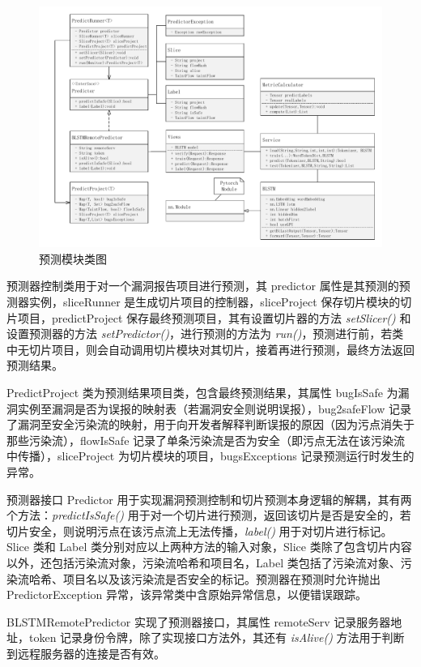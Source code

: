 \begin{figure}[!htbp]
    \centering
    \includegraphics[width=0.9\linewidth]{FIGs/chapter3/predictClass.pdf}
    \caption{预测模块类图}\label{predictClass}
\end{figure}

预测器控制类用于对一个漏洞报告项目进行预测，其 predictor 属性是其预测的预测器实例，sliceRunner 是生成切片项目的控制器，sliceProject 保存切片模块的切片项目，predictProject 保存最终预测项目，其有设置切片器的方法 \textit{setSlicer()} 和设置预测器的方法 \textit{setPredictor()}，进行预测的方法为 \textit{run()}，预测进行前，若类中无切片项目，则会自动调用切片模块对其切片，接着再进行预测，最终方法返回预测结果。

PredictProject 类为预测结果项目类，包含最终预测结果，其属性 bugIsSafe 为漏洞实例至漏洞是否为误报的映射表（若漏洞安全则说明误报），bug2safeFlow 记录了漏洞至安全污染流的映射，用于向开发者解释判断误报的原因（因为污点消失于那些污染流），flowIsSafe 记录了单条污染流是否为安全（即污点无法在该污染流中传播），sliceProject 为切片模块的项目，bugsExceptions 记录预测运行时发生的异常。

预测器接口 Predictor 用于实现漏洞预测控制和切片预测本身逻辑的解耦，其有两个方法：\textit{predictIsSafe()} 用于对一个切片进行预测，返回该切片是否是安全的，若切片安全，则说明污点在该污点流上无法传播，\textit{label()} 用于对切片进行标记。Slice 类和 Label 类分别对应以上两种方法的输入对象，Slice 类除了包含切片内容以外，还包括污染流对象，污染流哈希和项目名，Label 类包括了污染流对象、污染流哈希、项目名以及该污染流是否安全的标记。预测器在预测时允许抛出 PredictorException 异常，该异常类中含原始异常信息，以便错误跟踪。

BLSTMRemotePredictor 实现了预测器接口，其属性 remoteServ 记录服务器地址，token 记录身份令牌，除了实现接口方法外，其还有 \textit{isAlive()} 方法用于判断到远程服务器的连接是否有效。

